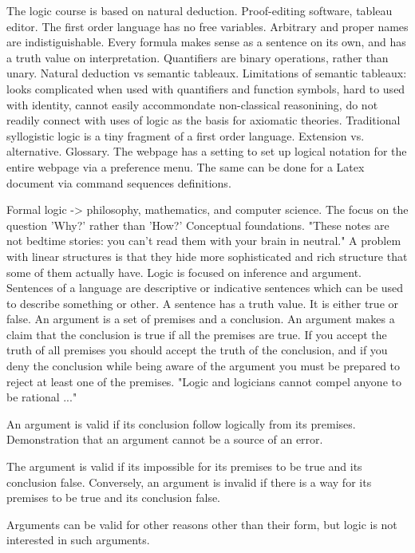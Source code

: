 The logic course is based on natural deduction.
Proof-editing software, tableau editor.
The first order language has no free variables. Arbitrary and proper names are
indistiguishable.
Every formula makes sense as a sentence on its own, and has a truth value on
interpretation.
Quantifiers are binary operations, rather than unary.
Natural deduction vs semantic tableaux.
Limitations of semantic tableaux: looks complicated when used with quantifiers
and function symbols, hard to used with identity, cannot easily accommondate
non-classical reasonining, do not readily connect with uses of logic as the
basis for axiomatic theories. 
Traditional syllogistic logic is a tiny fragment of a first order language.
Extension vs. alternative.
Glossary.
The webpage has a setting to set up logical notation for the entire webpage via
a preference menu. The same can be done for a Latex document via command
sequences definitions.

Formal logic -> philosophy, mathematics, and computer science.
The focus on the question 'Why?' rather than 'How?'
Conceptual foundations.
"These notes are not bedtime stories: you can't read them with your brain in
neutral."
A problem with linear structures is that they hide more sophisticated and rich
structure that some of them actually have.
Logic is focused on inference and argument.
Sentences of a language are descriptive or indicative sentences which can be
used to describe something or other. A sentence has a truth value. It is either
true or false.
An argument is a set of premises and a conclusion. An argument makes a claim
that the conclusion is true if all the premises are true.
If you accept the truth of all premises you should accept the truth of the
conclusion, and if you deny the conclusion while being aware of the argument you
must be prepared to reject at least one of the premises.
"Logic and logicians cannot compel anyone to be rational ..."

An argument is valid if its conclusion follow logically from its premises.
Demonstration that an argument cannot be a source of an error.

The argument is valid if its impossible for its premises to be true and its
conclusion false. Conversely, an argument is invalid if there is a way for its
premises to be true and its conclusion false.

Arguments can be valid for other reasons other than their form, but logic is
not interested in such arguments.
